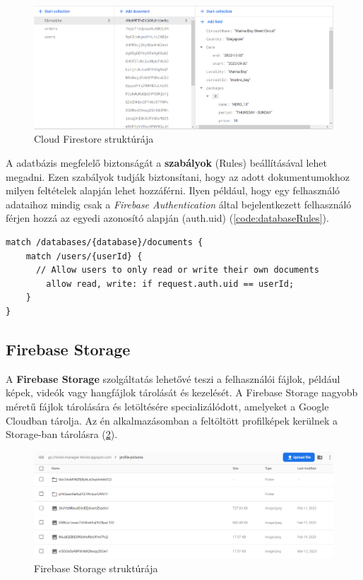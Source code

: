 \begin{figure}[!h]
	\centering
	\includegraphics[scale=0.4]{images/firestoreStructure}
	\caption{Cloud Firestore struktúrája}
	\label{abra:firestoreStructure}
\end{figure}

A adatbázis megfelelő biztonságát a \textbf{szabályok} (Rules) beállításával lehet megadni. Ezen szabályok tudják biztonsítani, hogy az adott dokumentumokhoz milyen feltételek alapján lehet hozzáférni. Ilyen például, hogy egy felhasználó adataihoz mindig csak a \textit{Firebase Authentication} által bejelentkezett felhasználó férjen hozzá az egyedi azonosító alapján (auth.uid) (\ref{code:databaseRules}).

\begin{lstlisting}[caption={Firestore szabályok.}, captionpos=b, label={code:databaseRules}]
match /databases/{database}/documents {
    match /users/{userId} {
      // Allow users to only read or write their own documents
    	allow read, write: if request.auth.uid == userId;
    }
}
\end{lstlisting}

\subsection {Firebase Storage}

A \textbf{Firebase Storage} szolgáltatás lehetővé teszi a felhasználói fájlok, például képek, videók vagy hangfájlok tárolását és kezelését. A Firebase Storage nagyobb méretű fájlok tárolására és letöltésére specializálódott, amelyeket a Google Cloudban tárolja. Az én alkalmazásomban a feltöltött profilképek kerülnek a Storage-ban tárolásra (\ref{abra:storageStructure}).

\begin{figure}[!h]
	\centering
	\includegraphics[scale=0.4]{images/storageStructure}
	\caption{Firebase Storage struktúrája}
	\label{abra:storageStructure}
\end{figure}
\pagebreak

